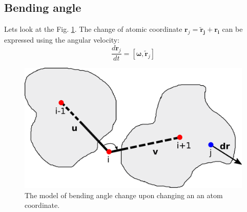 
\subsection{Bending angle}
Lets look at the Fig. \ref{Fig:BendingKinematics}. The change of atomic coordinate $\mathbf{r}_j = \mathbf{\widetilde{r}_j} + \mathbf{r_i}$ 
can be expressed using the angular velocity:
$$
\frac{d\mathbf{r}_j}{dt} = [\mathbf{\omega}, \mathbf{\widetilde{r}}_j]
$$

\begin{figure}[H]
    \centering
    \includegraphics[width=\linewidth]{Fig/BendingKinematics.png}
    \caption{The model of bending angle change upon changing an an atom coordinate.}
    \label{Fig:BendingKinematics}
\end{figure}

